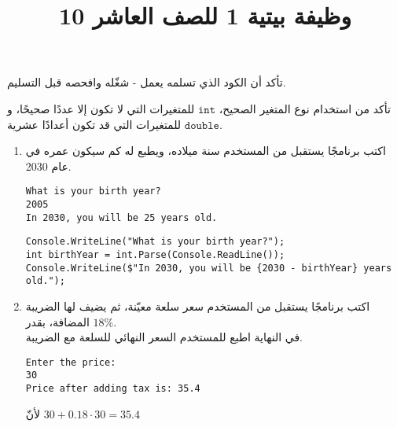 ﻿\documentclass[12pt]{article}
\title{وظيفة بيتية 1 للصف العاشر 10}
\begin{document}
\maketitle
\thispagestyle{fancy}

\begin{boxWarning}
تأكد أن الكود الذي تسلمه يعمل - شغّله وافحصه قبل التسليم.
\end{boxWarning}

\begin{boxNote}
    تأكد من استخدام نوع المتغير الصحيح، $\mathtt{int}$ للمتغيرات التي لا تكون إلا عددًا صحيحًا، و $\mathtt{double}$ للمتغيرات التي قد تكون أعدادًا عشرية.
\end{boxNote}

\begin{enumerate}

\vspace{1cm}
\item
اكتب برنامجًا يستقبل من المستخدم سنة ميلاده، ويطبع له كم سيكون عمره في عام 2030.
\begin{boxExample}
\begin{english}
\begin{verbatim}
What is your birth year?
2005
In 2030, you will be 25 years old.
\end{verbatim}
\end{english}
\end{boxExample}

\ifwithsols
\begin{boxSolution}
\begin{english}
\begin{verbatim}
Console.WriteLine("What is your birth year?");
int birthYear = int.Parse(Console.ReadLine());
Console.WriteLine($"In 2030, you will be {2030 - birthYear} years old.");
\end{verbatim}
\end{english}
\end{boxSolution}

\clearpage

\else
\vspace{1cm}
\fi

\item
اكتب برنامجًا يستقبل من المستخدم سعر سلعة معيّنة، ثم يضيف لها الضريبة المضافة، بقدر $18\%$. \\
في النهاية اطبع للمستخدم السعر النهائي للسلعة مع الضريبة.

\begin{boxExample}
\begin{english}
\begin{verbatim}
Enter the price:
30
Price after adding tax is: 35.4
\end{verbatim}
\end{english}
لأنّ $30 + 0.18 \cdot 30 = 35.4$
\end{boxExample}


\end{enumerate}
\end{document}
